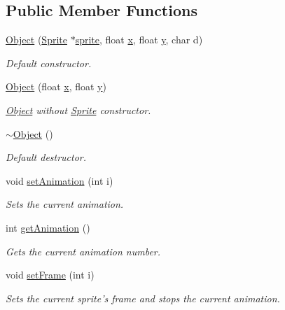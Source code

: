 \subsection*{Public Member Functions}
\begin{DoxyCompactItemize}
\item 
\hyperlink{class_object_a9e5569564089c40dbfa85703035ddaf2}{Object} (\hyperlink{class_sprite}{Sprite} $\ast$\hyperlink{class_object_ad936466f3f6b6e8fa401842c573b44e6}{sprite}, float \hyperlink{class_object_a99addca3b5d96c214fa8f90474224699}{x}, float \hyperlink{class_object_a2870044ec214e97550ee28db89c6382a}{y}, char d)
\begin{DoxyCompactList}\small\item\em Default constructor. \end{DoxyCompactList}\item 
\hyperlink{class_object_a6259cbd5b31dfdbffe076fc491da6b55}{Object} (float \hyperlink{class_object_a99addca3b5d96c214fa8f90474224699}{x}, float \hyperlink{class_object_a2870044ec214e97550ee28db89c6382a}{y})
\begin{DoxyCompactList}\small\item\em \hyperlink{class_object}{Object} without \hyperlink{class_sprite}{Sprite} constructor. \end{DoxyCompactList}\item 
\hyperlink{class_object_ae8f5483f459e46687bd01e6f9977afd3}{$\sim$\-Object} ()
\begin{DoxyCompactList}\small\item\em Default destructor. \end{DoxyCompactList}\item 
void \hyperlink{class_object_a182782f2325980f649409507c2970af8}{set\-Animation} (int i)
\begin{DoxyCompactList}\small\item\em Sets the current animation. \end{DoxyCompactList}\item 
int \hyperlink{class_object_ab58cde576bd8ae773fa742f147a792f2}{get\-Animation} ()
\begin{DoxyCompactList}\small\item\em Gets the current animation number. \end{DoxyCompactList}\item 
void \hyperlink{class_object_a21d5b472e193c2665cd06be4a9cc270d}{set\-Frame} (int i)
\begin{DoxyCompactList}\small\item\em Sets the current sprite's frame and stops the current animation. \end{DoxyCompactList}\item 

\end{DoxyCompactItemize}
